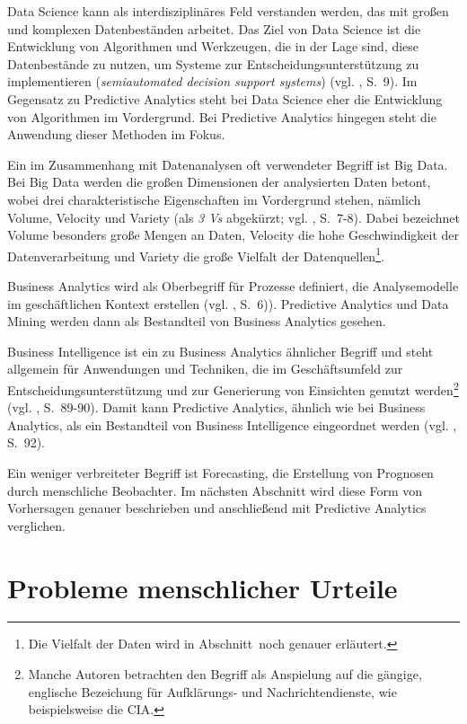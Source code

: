 Data Science kann als interdisziplinäres Feld verstanden werden, das mit
großen und komplexen Datenbeständen arbeitet. Das Ziel von Data Science
ist die Entwicklung von Algorithmen und Werkzeugen, die in der Lage sind, diese
Datenbestände zu nutzen, um Systeme zur Entscheidungsunterstützung zu
implementieren (\emph{semiautomated decision support systems}) (vgl.
\cite{Dinov}, S.~9).  Im Gegensatz zu Predictive Analytics steht bei 
Data Science eher die Entwicklung von Algorithmen im Vordergrund. 
Bei Predictive Analytics hingegen steht die Anwendung dieser Methoden im 
Fokus.

Ein im Zusammenhang mit Datenanalysen oft verwendeter Begriff ist Big Data.
Bei Big Data werden die großen Dimensionen der analysierten Daten betont, wobei
drei charakteristische Eigenschaften im Vordergrund stehen, nämlich Volume, Velocity 
und Variety (als \emph{3 Vs} abgekürzt; vgl. \cite{McCarthy}, S.~7-8). Dabei bezeichnet Volume
besonders große Mengen an Daten, Velocity die hohe Geschwindigkeit der Datenverarbeitung
und Variety die große Vielfalt der Datenquellen\footnote{
Die Vielfalt der Daten wird in Abschnitt~\xcom noch genauer erläutert.
}. 

Business Analytics wird als Oberbegriff für Prozesse definiert, die
Analysemodelle im geschäftlichen Kontext erstellen (vgl. \cite{McCarthy}, S.~6)). 
Predictive Analytics und Data Mining werden dann als Bestandteil von Business Analytics
gesehen. 


Business Intelligence ist ein zu Business Analytics ähnlicher
Begriff und steht allgemein für Anwendungen und Techniken, die im
Geschäftsumfeld zur Entscheidungsunterstützung und zur Generierung von
Einsichten genutzt werden\footnote{
Manche Autoren betrachten den Begriff \grqq{} als Anspielung
auf die gängige, englische Bezeichung für Aufklärungs- und Nachrichtendienste,
wie beispielsweise die CIA.
} (vgl. \cite{Gluchowski}, S.~89-90). Damit kann Predictive Analytics,
ähnlich wie bei Business Analytics, als ein Bestandteil von 
Business Intelligence eingeordnet werden (vgl. \cite{Gluchowski}, S.~92). 

Ein weniger verbreiteter Begriff ist Forecasting,
die Erstellung von Prognosen durch menschliche Beobachter. Im nächsten Abschnitt
wird diese Form von Vorhersagen genauer beschrieben und anschließend mit
Predictive Analytics verglichen.  

\section{Probleme menschlicher Urteile}


